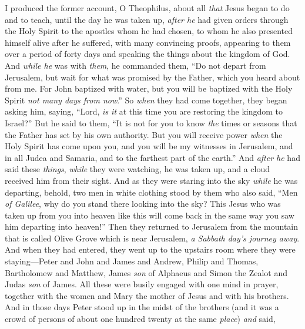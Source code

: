 
\begin{biblechapter} %
 I produced the former account, O Theophilus, about all \textit{that} Jesus began to do and to teach,
\verse until the day he was taken up, \textit{after he} had given orders through the Holy Spirit to the apostles whom he had chosen,
\verse to whom he also presented himself alive after he suffered, with many convincing proofs, appearing to them over a period of forty days and speaking the things about the kingdom of God.
\verse And \textit{while he} was with \textit{them}, he commanded them, “Do not depart from Jerusalem, but wait for what was promised by the Father, which you heard about from me.
\verse For John baptized with water, but you will be baptized with the Holy Spirit \textit{not many days from now}.”
 So \textit{when} they had come together, they began asking him, saying, “Lord, \textit{is it} at this time you are restoring the kingdom to Israel?”
\verse But he said to them, “It is not for you to know \textit{the} times or seasons that the Father has set by his own authority.
\verse But you will receive power \textit{when} the Holy Spirit has come upon you, and you will be my witnesses in Jerusalem, and in all Judea and Samaria, and to the farthest part of the earth.”
\verse And \textit{after he} had said these \textit{things}, \textit{while} they were watching, he was taken up, and a cloud received him from their sight.
\verse And as they were staring into the sky \textit{while} he was departing, behold, two men in white clothing stood by them
\verse who also said, “Men \textit{of Galilee}, why do you stand there looking into the sky? This Jesus who was taken up from you into heaven like this will come back in the same way you saw him departing into heaven!”
 Then they returned to Jerusalem from the mountain that is called Olive Grove which is near Jerusalem, \textit{a Sabbath day’s journey away}.
\verse And when they had entered, they went up to the upstairs room where they were staying—Peter and John and James and Andrew, Philip and Thomas, Bartholomew and Matthew, James \textit{son} of Alphaeus and Simon the Zealot and Judas \textit{son} of James.
\verse All these were busily engaged with one mind in prayer, together with the women and Mary the mother of Jesus and with his brothers.
\verse And in those days Peter stood up in the midst of the brothers (and it was a crowd of persons of about one hundred twenty at the same \textit{place}) \textit{and} said,

\end{biblechapter}
